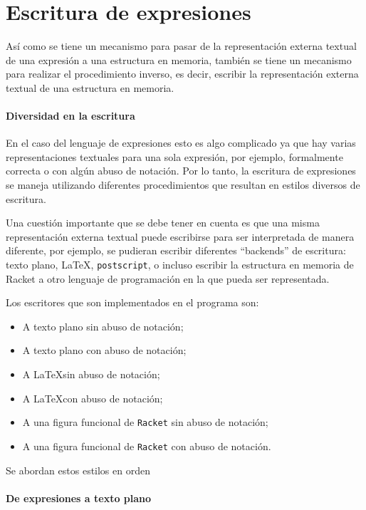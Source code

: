 \documentclass[letterpaper,twoside,openright,11pt]{book}
\begin{document}
\nwenddocs{}\section*{Escritura de expresiones}

Así como se tiene un mecanismo para pasar de la representación externa textual de una expresión a una estructura en memoria, también se tiene un mecanismo para realizar el procedimiento inverso, es decir, escribir la representación externa textual de una estructura en memoria.

\nwenddocs{}\paragraph{Diversidad en la escritura}
En el caso del lenguaje de expresiones esto es algo complicado ya que hay varias representaciones textuales para una sola expresión, por ejemplo, formalmente correcta o con algún abuso de notación. Por lo tanto, la escritura de expresiones se maneja utilizando diferentes procedimientos que resultan en estilos diversos de escritura.

Una cuestión importante que se debe tener en cuenta es que una misma representación externa textual puede escribirse para ser interpretada de manera diferente, por ejemplo, se pudieran escribir diferentes ``backends'' de escritura: texto plano, \LaTeX, {\tt{}postscript}, o incluso escribir la estructura en memoria de Racket a otro lenguaje de programación en la que pueda ser representada.

Los escritores que son implementados en el programa son:

\begin{itemize}
\item A texto plano sin abuso de notación;
\item A texto plano con abuso de notación;
\item A \LaTeX sin abuso de notación;
\item A \LaTeX con abuso de notación;
\item A una figura funcional de {\tt{}Racket} sin abuso de notación;
\item A una figura funcional de {\tt{}Racket} con abuso de notación.
\end{itemize}

Se abordan estos estilos en orden

\nwenddocs{}\paragraph{De expresiones a texto plano}
\end{document}
